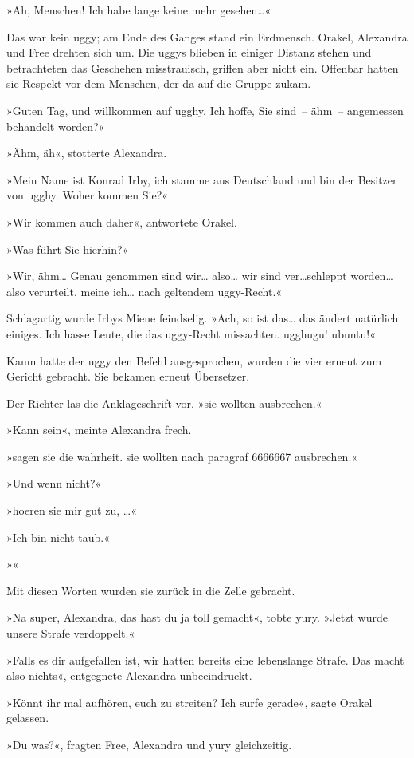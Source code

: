 »Ah, Menschen! Ich habe lange keine mehr gesehen…«

Das war kein uggy; am Ende des Ganges stand ein Erdmensch. Orakel, Alexandra und Free drehten sich um. Die uggys blieben in einiger Distanz stehen und betrachteten das Geschehen misstrauisch, griffen aber nicht ein. Offenbar hatten sie Respekt vor dem Menschen, der da auf die Gruppe zukam.

»Guten Tag, und willkommen auf ugghy. Ich hoffe, Sie sind~– ähm~– angemessen behandelt worden?«

»Ähm, äh«, stotterte Alexandra.

»Mein Name ist Konrad Irby, ich stamme aus Deutschland und bin der Besitzer von ugghy. Woher kommen Sie?«

»Wir kommen auch daher«, antwortete Orakel.

»Was führt Sie hierhin?«

»Wir, ähm… Genau genommen sind wir… also… wir sind ver…schleppt worden… also verurteilt, meine ich… nach geltendem uggy-Recht.«

Schlagartig wurde Irbys Miene feindselig. »Ach, so ist das… das ändert natürlich einiges. Ich hasse Leute, die das uggy-Recht missachten. ugghugu! ubuntu!«

Kaum hatte der uggy den Befehl ausgesprochen, wurden die vier erneut zum Gericht gebracht. Sie bekamen erneut Übersetzer.

Der Richter las die Anklageschrift vor. »sie wollten ausbrechen.«

»Kann sein«, meinte Alexandra frech.

»sagen sie die wahrheit. sie wollten nach paragraf 6666667 ausbrechen.«

»Und wenn nicht?«

»hoeren sie mir gut zu, …«

»Ich bin nicht taub.«

»«

Mit diesen Worten wurden sie zurück in die Zelle gebracht.

»Na super, Alexandra, das hast du ja toll gemacht«, tobte yury. »Jetzt wurde unsere Strafe verdoppelt.«

»Falls es dir aufgefallen ist, wir hatten bereits eine lebenslange Strafe. Das macht also nichts«, entgegnete Alexandra unbeeindruckt.

»Könnt ihr mal aufhören, euch zu streiten? Ich surfe gerade«, sagte Orakel gelassen.

»Du was?«, fragten Free, Alexandra und yury gleichzeitig.

